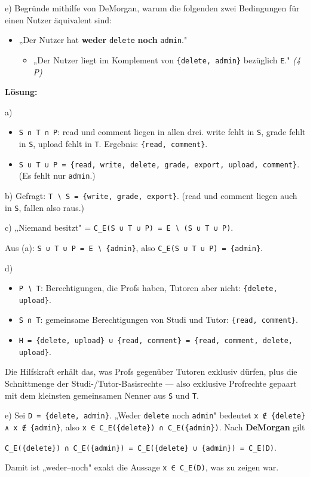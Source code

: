 \documentclass[11pt, a4paper]{article}
\begin{document}
e) Begründe mithilfe von DeMorgan, warum die folgenden zwei Bedingungen für einen Nutzer äquivalent sind:

\begin{itemize}
  \item „Der Nutzer hat \textbf{weder} \texttt{delete} \textbf{noch} \texttt{admin}."
\begin{itemize}
  \item „Der Nutzer liegt im Komplement von \texttt{\{delete, admin\}} bezüglich \texttt{E}." \textit{(4 P)}
\end{itemize}
\end{itemize}

\textbf{Lösung:}


a)

\begin{itemize}
  \item \texttt{S ∩ T ∩ P}: read und comment liegen in allen drei. write fehlt in \texttt{S}, grade fehlt in \texttt{S}, upload fehlt in \texttt{T}. Ergebnis: \texttt{\{read, comment\}}.
  \item \texttt{S ∪ T ∪ P = \{read, write, delete, grade, export, upload, comment\}}. (Es fehlt nur \texttt{admin}.)
\end{itemize}

b) Gefragt: \texttt{T ∖ S = \{write, grade, export\}}. (read und comment liegen auch in \texttt{S}, fallen also raus.)


c) „Niemand besitzt"  =  \texttt{C\_E(S ∪ T ∪ P) = E ∖ (S ∪ T ∪ P)}.

Aus (a): \texttt{S ∪ T ∪ P = E ∖ \{admin\}}, also \texttt{C\_E(S ∪ T ∪ P) = \{admin\}}.


d)

\begin{itemize}
  \item \texttt{P ∖ T}: Berechtigungen, die Profs haben, Tutoren aber nicht: \texttt{\{delete, upload\}}.
  \item \texttt{S ∩ T}: gemeinsame Berechtigungen von Studi und Tutor: \texttt{\{read, comment\}}.
  \item \texttt{H = \{delete, upload\} ∪ \{read, comment\} = \{read, comment, delete, upload\}}.
\end{itemize}

Die Hilfskraft erhält das, was Profs gegenüber Tutoren exklusiv dürfen, plus die Schnittmenge der Studi-/Tutor-Basisrechte — also exklusive Profrechte gepaart mit dem kleinsten gemeinsamen Nenner aus \texttt{S} und \texttt{T}.


e) Sei \texttt{D = \{delete, admin\}}. „Weder \texttt{delete} noch \texttt{admin}" bedeutet \texttt{x ∉ \{delete\}  ∧  x ∉ \{admin\}}, also \texttt{x ∈ C\_E(\{delete\}) ∩ C\_E(\{admin\})}. Nach \textbf{DeMorgan} gilt

\texttt{C\_E(\{delete\}) ∩ C\_E(\{admin\}) = C\_E(\{delete\} ∪ \{admin\}) = C\_E(D)}.

Damit ist „weder–noch" exakt die Aussage \texttt{x ∈ C\_E(D)}, was zu zeigen war.





\end{document}

